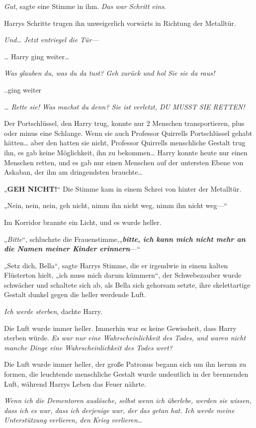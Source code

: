{\emph{Gut}, sagte eine Stimme in ihm. \emph{Das war Schritt eins}.

Harrys Schritte trugen ihn unweigerlich vorwärts in Richtung der Metalltür.

\emph{Und… Jetzt entriegel die Tür—}

… Harry ging weiter…

\emph{Was glauben du, was du da tust? Geh zurück und hol Sie sie da raus!}

..ging weiter

\emph{… Rette sie! Was machst du denn? Sie ist verletzt, DU MUSST SIE RETTEN!}

Der Portschlüssel, den Harry trug, konnte nur 2 Menschen transportieren, plus oder minus eine Schlange. Wenn sie auch Professor Quirrells Portschlüssel gehabt hätten… aber den hatten sie nicht, Professor Quirrells menschliche Gestalt trug ihn, es gab keine Möglichkeit, ihn zu bekommen… Harry konnte heute nur einen Menschen retten, und es gab nur einen Menschen auf der untersten Ebene von Askaban, der ihn am dringendsten brauchte…

„\textbf{GEH NICHT!}“ Die Stimme kam in einem Schrei von hinter der Metalltür.

„Nein, nein, nein, geh nicht, nimm ihn nicht weg, nimm ihn nicht weg—“

Im Korridor brannte ein Licht, und es wurde heller.

„\emph{Bitte}“, schluchzte die Frauenstimme,„\textbf{\emph{bitte, ich kann mich nicht mehr an die Namen meiner Kinder erinnern}}—“

„Setz dich, Bella“, sagte Harrys Stimme, die er irgendwie in einem kalten Flüsterton hielt, „ich muss mich darum kümmern“, der Schwebezauber wurde schwächer und schaltete sich ab, als Bella sich gehorsam setzte, ihre skelettartige Gestalt dunkel gegen die heller werdende Luft.

\emph{Ich werde sterben}, dachte Harry.

Die Luft wurde immer heller. Immerhin war es keine Gewissheit, dass Harry sterben würde. \emph{Es war nur eine Wahrscheinlichkeit des Todes, und waren nicht manche Dinge eine Wahrscheinlichkeit des Todes wert?}

Die Luft wurde immer heller, der große Patronus begann sich um ihn herum zu formen, die leuchtende menschliche Gestalt wurde undeutlich in der brennenden Luft, während Harrys Leben das Feuer nährte.

\emph{Wenn ich die Dementoren auslösche, selbst wenn ich überlebe, werden sie wissen, dass ich es war, dass ich derjenige war, der das getan hat. Ich werde meine Unterstützung verlieren, den Krieg verlieren…}

}
